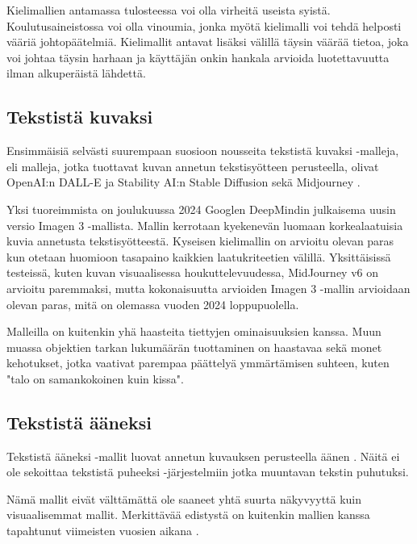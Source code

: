 Kielimallien antamassa tulosteessa voi olla virheitä useista syistä.
Koulutusaineistossa voi olla vinoumia, jonka myötä kielimalli voi tehdä
helposti vääriä johtopäätelmiä. Kielimallit antavat lisäksi välillä täysin
väärää tietoa, joka voi johtaa täysin harhaan ja käyttäjän onkin hankala
arvioida luotettavuutta ilman alkuperäistä lähdettä.
\parencite{akavaworksNakokulmiaTekoalyynOsa6}

\subsection{Tekstistä kuvaksi}

Ensimmäisiä selvästi suurempaan suosioon nousseita tekstistä kuvaksi -malleja,
eli malleja, jotka tuottavat kuvan annetun tekstisyötteen perusteella, olivat
OpenAI:n DALL-E \parencite{openAIDallE} ja Stability AI:n Stable Diffusion
\parencite{stableDiffusionLaunch} sekä Midjourney
\parencite{twitter1547108864788553729}.

Yksi tuoreimmista on joulukuussa 2024 Googlen DeepMindin julkaisema uusin
versio Imagen 3 -mallista. Mallin kerrotaan kyekenevän luomaan korkealaatuisia
kuvia annetusta tekstisyötteestä. Kyseisen kielimallin on arvioitu olevan paras
kun otetaan huomioon tasapaino kaikkien laatukriteetien välillä. Yksittäisissä
testeissä, kuten kuvan visuaalisessa houkuttelevuudessa, MidJourney v6 on
arvioitu paremmaksi, mutta kokonaisuutta arvioiden Imagen 3 -mallin arvioidaan
olevan paras, mitä on olemassa vuoden 2024 loppupuolella.
\parencite{googleDeepmindImagen3_v3report}

Malleilla on kuitenkin yhä haasteita tiettyjen ominaisuuksien kanssa. Muun
muassa objektien tarkan lukumäärän tuottaminen on haastavaa sekä monet
kehotukset, jotka vaativat parempaa päättelyä ymmärtämisen suhteen, kuten
"talo on samankokoinen kuin kissa". \parencite{googleDeepmindImagen3_v3report}

\subsection{Tekstistä ääneksi}

Tekstistä ääneksi -mallit luovat annetun kuvauksen perusteella äänen
\parencite{liu2023audioldmtexttoaudiogenerationlatent}. Näitä ei ole sekoittaa
tekstistä puheeksi -järjestelmiin jotka muuntavan tekstin puhutuksi.

Nämä mallit eivät välttämättä ole saaneet yhtä suurta näkyvyyttä kuin
visuaalisemmat mallit. Merkittävää edistystä on kuitenkin mallien kanssa
tapahtunut viimeisten vuosien aikana
\parencite{liu2023audioldmtexttoaudiogenerationlatent}.

